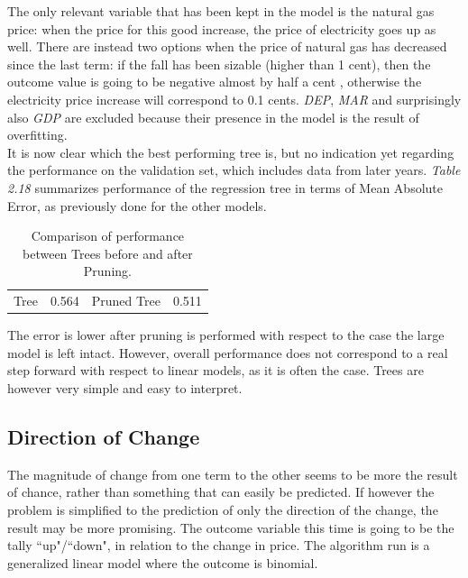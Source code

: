 \documentclass{book}
\begin{document}
The only relevant variable that has been kept in the model is the natural gas price: when the price for this good increase, the price of electricity goes up as well. There are instead two options when the price of natural gas has decreased since the last term: if the fall has been sizable (higher than 1 cent), then the outcome value is going to be negative almost by half a cent , otherwise the electricity price increase will correspond to 0.1 cents. \textit{DEP}, \textit{MAR} and surprisingly also \textit{GDP} are excluded because their presence in the model is the result of overfitting.\\

It is now clear which the best performing tree is, but no indication yet regarding the performance on the validation set, which includes data from later years. \textit{Table 2.18} summarizes performance of the regression tree in terms of Mean Absolute Error, as previously done for the other models.

\bigskip
\begin{table}[H]
\begin{center}
\begin{tabular}{|c|c|c|c|}
\hline
\rowcolor{maroon} \multicolumn{4}{|c|}{Mean Absolute Error, in Euro Cents}\\
\hline
Tree&0.564&Pruned Tree&0.511\\
\hline
\end{tabular}
\caption{Comparison of performance between Trees before and after Pruning.}
\end{center}
\end{table}
\bigskip

The error is lower after pruning is performed with respect to the case the large model is left intact. However, overall performance does not correspond to a real step forward with respect to linear models, as it is often the case. Trees are however very simple and easy to interpret.

\subsection{Direction of Change}

The magnitude of change from one term to the other seems to be more the result of chance, rather than something that can easily be predicted. If however the problem is simplified to the prediction of only the direction of the change, the result may be more promising. The outcome variable this time is going to be the tally ``up"/``down", in relation to the change in price. The algorithm run is a generalized linear model where the outcome is binomial.\\
\end{document}
